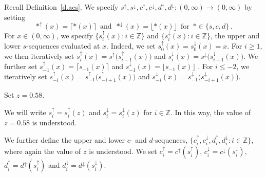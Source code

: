 \documentclass[letterpaper,11pt,oneside,reqno]{amsbook}
\newcommand{\Z}{\ensuremath{\mathbb{Z}}}
\numberwithin{figure}{chapter}
\theoremstyle{definition}
\theoremstyle{definition}
\theoremstyle{definition}
\theoremstyle{definition}
\theoremstyle{definition}
\begin{document}
 Recall Definition~\ref{d.acs}. 
 We specify $s^\uparrow,s^\downarrow,c^\uparrow,c^\downarrow,d^\uparrow,d^\downarrow:(0,\infty) \to (0,\infty)$
 by setting 
 $$
 *^\uparrow(x) = \lceil *(x) \rceil \, \, \, \textrm{and} \, \, \,   *^\downarrow(x) = \lfloor *(x) \rfloor \, \, \, \textrm{for} \, \, \,  * \in \{s,c,d\} \, .
 $$
 For $x \in (0,\infty)$, we specify  $\big\{ s^\uparrow_i(x): i \in \Z \big\}$ and  $\big\{ s^\downarrow_i(x): i \in \Z \big\}$, the upper and lower $s$-sequences evaluated at $x$.
 Indeed, we set $s_0^\uparrow(x) = s_0^\downarrow(x) = x$.
 For $i \geq 1$, we then iteratively set $s^\uparrow_i(x) = s^\uparrow \big(s^\uparrow_{i-1}(x)\big)$ and  $s^\downarrow_i(x) = s^\downarrow \big(s^\downarrow_{i-1}(x)\big)$.
 We further set $s_{-1}^\uparrow (x) = \lceil s_{-1}(x) \rceil$ and  $s_{-1}^\downarrow (x) = \lfloor s_{-1}(x) \rfloor$ . For $i \leq -2$, we iteratively set $s_{-i}^\uparrow(x) = s_{-1}^\uparrow \big( s_{-i+1}^\uparrow(x) \big)$ and  $s_{-i}^\downarrow(x) = s_{-1}^\downarrow \big( s_{-i+1}^\downarrow(x) \big)$.
 
 
 
 Set $z =0.58$. 
 
 We will write $s_i^\uparrow = s_i^\uparrow(z)$ and  $s_i^\downarrow = s_i^\downarrow(z)$ for $i \in \Z$. In this way, the value of $z = 0.58$ is understood.
 
 We further define the upper and lower $c$- and $d$-sequences, $\big\{c^\uparrow_i,c^\downarrow_i,d^\uparrow_i,d^\downarrow_i: i \in \Z \big\}$, where again the value of $z$ is understood.
  We set $c_i^\uparrow = c^\uparrow(s_i^\uparrow)$,  $c_i^\downarrow = c^\downarrow(s_i^\downarrow)$,  $d_i^\uparrow = d^\uparrow(s_i^\uparrow)$ and  $d_i^\downarrow = d^\downarrow(s_i^\downarrow)$.
  
\end{document}
